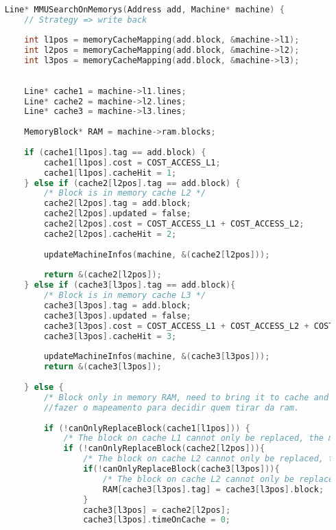 \documentclass{article}
\begin{document}
\begin{lstlisting}[caption={Função MMUSearchOnMemorys},label={lst:cod6},language=C]

    Line* MMUSearchOnMemorys(Address add, Machine* machine) {
        // Strategy => write back
        
        int l1pos = memoryCacheMapping(add.block, &machine->l1);
        int l2pos = memoryCacheMapping(add.block, &machine->l2);
        int l3pos = memoryCacheMapping(add.block, &machine->l3);
    
    
        Line* cache1 = machine->l1.lines;
        Line* cache2 = machine->l2.lines;
        Line* cache3 = machine->l3.lines;
    
        MemoryBlock* RAM = machine->ram.blocks;
    
        if (cache1[l1pos].tag == add.block) { 
            cache1[l1pos].cost = COST_ACCESS_L1;
            cache1[l1pos].cacheHit = 1;
        } else if (cache2[l2pos].tag == add.block) { 
            /* Block is in memory cache L2 */
            cache2[l2pos].tag = add.block;
            cache2[l2pos].updated = false;
            cache2[l2pos].cost = COST_ACCESS_L1 + COST_ACCESS_L2;
            cache2[l2pos].cacheHit = 2;
    
            updateMachineInfos(machine, &(cache2[l2pos]));
    
            return &(cache2[l2pos]);
        } else if (cache3[l3pos].tag == add.block){
            /* Block is in memory cache L3 */
            cache3[l3pos].tag = add.block;
            cache3[l3pos].updated = false;
            cache3[l3pos].cost = COST_ACCESS_L1 + COST_ACCESS_L2 + COST_ACCESS_L3;
            cache3[l3pos].cacheHit = 3;
    
            updateMachineInfos(machine, &(cache3[l3pos]));
            return &(cache3[l3pos]);
    
        } else { 
            /* Block only in memory RAM, need to bring it to cache and manipulate the blocks */
            //fazer o mapeamento para decidir quem tirar da ram.
            
            if (!canOnlyReplaceBlock(cache1[l1pos])) { 
                /* The block on cache L1 cannot only be replaced, the memories must be updated */
                if (!canOnlyReplaceBlock(cache2[l2pos])){
                    /* The block on cache L2 cannot only be replaced, the memories must be updated */
                    if(!canOnlyReplaceBlock(cache3[l3pos])){
                        /* The block on cache L2 cannot only be replaced, the memories must be updated */
                        RAM[cache3[l3pos].tag] = cache3[l3pos].block;
                    }
                    cache3[l3pos] = cache2[l2pos];
                    cache3[l3pos].timeOnCache = 0;
    

\end{lstlisting}
\end{document}
